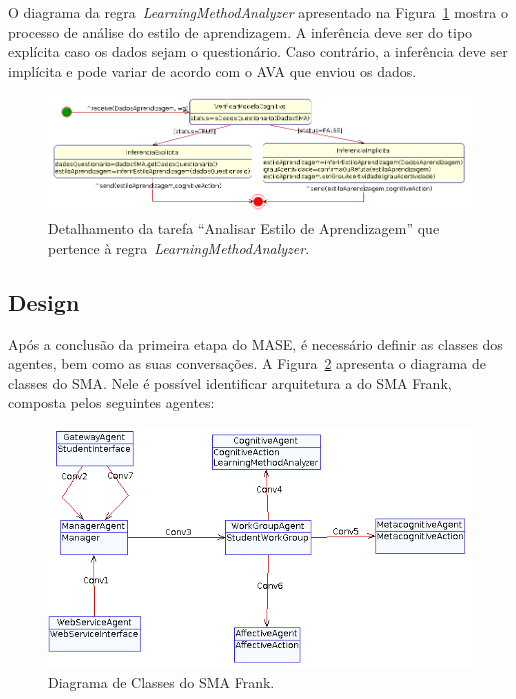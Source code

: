 O diagrama da regra~\emph{LearningMethodAnalyzer} apresentado na Figura~\ref{fig:td-analise-aprendizagem} mostra o processo de análise do estilo de aprendizagem. A inferência deve ser do tipo explícita caso os dados sejam o questionário. Caso contrário, a inferência deve ser implícita e pode variar de acordo com o AVA que enviou os dados.
\begin{figure}
	\centering
	\includegraphics[scale=0.48]{images/td-analise-aprendizagem.png}
	\caption{Detalhamento da tarefa ``Analisar Estilo de Aprendizagem'' que pertence à regra~\emph{LearningMethodAnalyzer}.}
	\label{fig:td-analise-aprendizagem}
\end{figure}

\subsection{Design}\label{subsection:design}

Após a conclusão da primeira etapa do MASE, é necessário definir as classes dos agentes, bem como as suas conversações. A Figura~\ref{fig:agent-class-diagram} apresenta o diagrama de classes do SMA. Nele é possível identificar arquitetura a do SMA Frank, composta pelos seguintes agentes:

\begin{figure}
	\centering
	\includegraphics[scale=0.48]{images/agent-class-diagram.png}
	\caption{Diagrama de Classes do SMA Frank.}
	\label{fig:agent-class-diagram}
\end{figure}

